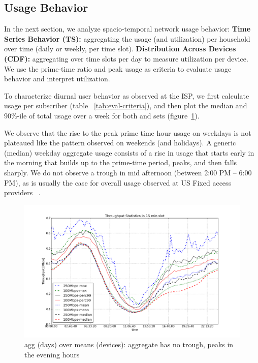\subsection{Usage Behavior}\label{subsec:behavior}

In the next section, we analyze spacio-temporal network usage behavior:
\textbf{Time Series Behavior (TS): }aggregating the usage (and utilization) per household
over time (daily or weekly, per time slot). \textbf{Distribution Across Devices (CDF): }aggregating over time slots per day to measure utilization per device. We use the prime-time ratio and peak usage
as criteria to evaluate usage behavior and interpret utilization.

To characterize diurnal user behavior as observed at the ISP, we first calculate
usage per subscriber (table ~\ref{tab:eval-criteria}), and then plot the median and
90\%-ile of total usage over a week for both \test and \control
sets (figure~\ref{fig:TS-data-rate-daily}).

We observe that the rise to the peak prime time hour usage on weekdays
is not plateaued like the pattern observed on weekends (and holidays).
A generic (median) weekday aggregate usage consists of a rise in usage that starts
early in the morning that builds up to the prime-time period, peaks, and then falls sharply.
We do not observe a trough in mid afternoon (between 2:00 PM -- 6:00 PM), as is usually
the case for overall usage observed at US Fixed access providers 
~\cite{sandvine20141h}.

\begin{figure}[ht!]
\begin{minipage}{\linewidth}
  \centering
  \includegraphics[width=\linewidth]{figures/describe-total-throughput-per-day[replace].png}
  \caption{agg (days) over means (devices): aggregate has no trough, peaks in the evening hours}
  \label{fig:TS-data-rate-daily}
\end{minipage}
\end{figure}

